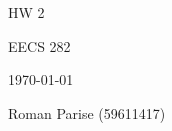 \centering
\vspace*{5cm}
{\huge HW 2 \par}
{\Large EECS 282 \par}
{\Large \today \par}
\vspace{1cm}
{\large Roman Parise (59611417) \par}
\vspace{1cm}

